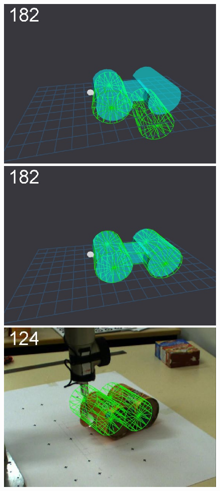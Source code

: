 \begin{figure}[t]
{\includegraphics[width=\imgCXwid]{./C5_2exp_6_3}
\includegraphics[width=\imgCXwid]{./C5_3exp_6_3}
\includegraphics[width=\imgCXwid]{./C2_3exp_75_3}
}
\end{figure}
